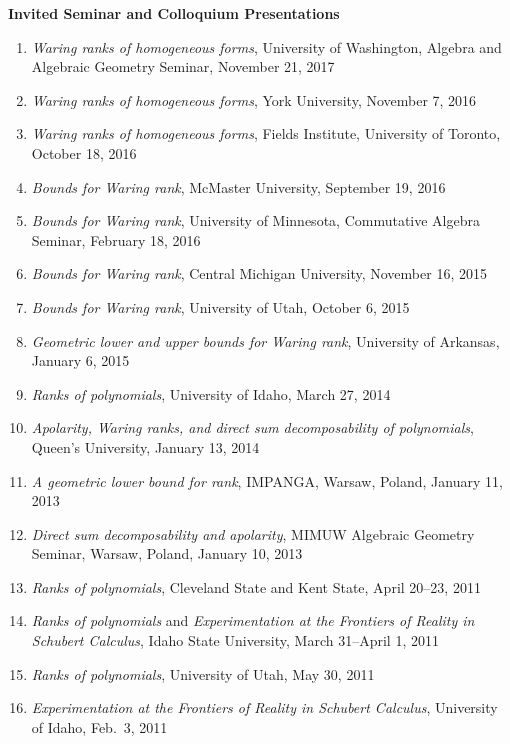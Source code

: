 \documentclass[12pt]{article}
\begin{document}


\textbf{Invited Seminar and Colloquium Presentations}
\begin{enumerate}
\item \textit{Waring ranks of homogeneous forms}, University of Washington, Algebra and Algebraic Geometry Seminar, November 21, 2017
\item \textit{Waring ranks of homogeneous forms}, York University, November 7, 2016
\item \textit{Waring ranks of homogeneous forms}, Fields Institute, University of Toronto, October 18, 2016
\item \textit{Bounds for Waring rank}, McMaster University, September 19, 2016
\item \textit{Bounds for Waring rank}, University of Minnesota, Commutative Algebra Seminar, February 18, 2016
\item \textit{Bounds for Waring rank}, Central Michigan University, November 16, 2015
\item \textit{Bounds for Waring rank}, University of Utah, October 6, 2015
\item \textit{Geometric lower and upper bounds for Waring rank}, University of Arkansas, January 6, 2015
\item \textit{Ranks of polynomials}, University of Idaho, March 27, 2014
\item \textit{Apolarity, Waring ranks, and direct sum decomposability of polynomials}, Queen's University, January 13, 2014
\item \textit{A geometric lower bound for rank}, IMPANGA, Warsaw, Poland, January 11, 2013
\item \textit{Direct sum decomposability and apolarity}, MIMUW Algebraic Geometry Seminar, Warsaw, Poland, January 10, 2013
\item \textit{Ranks of polynomials}, Cleveland State and Kent State, April 20--23, 2011
\item \textit{Ranks of polynomials} and \textit{Experimentation at the Frontiers of Reality in Schubert Calculus}, Idaho State University, March 31--April 1, 2011
\item \textit{Ranks of polynomials}, University of Utah, May 30, 2011
\item \textit{Experimentation at the Frontiers of Reality in Schubert Calculus}, University of Idaho, Feb.\ 3, 2011


\end{enumerate}
\end{document}
